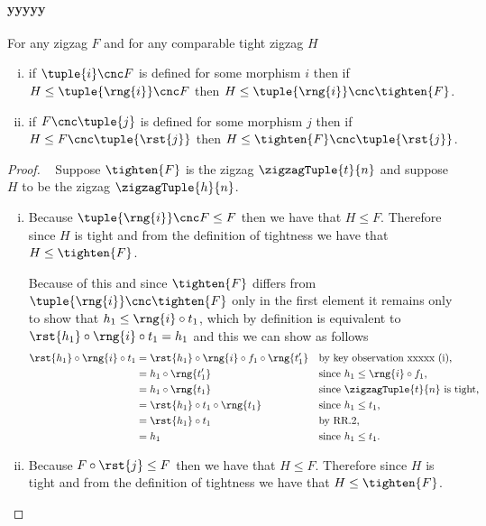 \paragraph*{yyyyy}
\begin{lemma}
For any zigzag $F$ and for any comparable tight zigzag $H$
\begin{enumerate}[(i)]
\item if $\tuple{i} \cnc F$ is defined for some morphism $i$ then
if  $H \leq \tuple{\rng{i}} \cnc F$
then $H \leq  \tuple{\rng{i}} \cnc \tighten{F}$.
\item if $F\cnc\tuple{j}$ is defined for some morphism $j$ then
if  $H \leq F \cnc \tuple{\rst{j}}$
then $H \leq  \tighten{F} \cnc \tuple{\rst{j}}$.
\end{enumerate}
\end{lemma}
\begin{proof}
~
Suppose $\tighten{F}$ is the zigzag $\zigzagTuple{t}{n}$
and suppose $H$ to be the zigzag $\zigzagTuple{h}{n}$.
\begin{enumerate}[(i)]
\item %
Because $\tuple{\rng{i}} \cnc F \leq F$ then we have that
$H \leq F$. Therefore since $H$ is tight and from the definition
of tightness we have that
$H \leq \tighten{F}$.

Because of this and since $\tighten{F}$ differs from
$\tuple{\rng{i}} \cnc \tighten{F}$ only in the first element
it remains only to show that
$h_1 \leq \rng{i} \circ t_1$, which by definition
is equivalent to $\rst{h_1} \circ \rng{i} \circ t_1 = h_1$
and this we  can show as follows
\begin{align*}
\rst{h_1} \circ \rng{i} \circ t_1
  &= \rst{h_1} \circ \rng{i} \circ f_1 \circ \rng{t'_1}
  && \mbox{by key observation xxxxx (i),}\\
  &= h_1 \circ \rng{t'_1} 
  && \mbox{since $h_1 \leq \rng{i} \circ f_1$,}\\
  &= h_1 \circ \rng{t_1}
  && \mbox{since $\zigzagTuple{t}{n}$ is tight, }\\
  &= \rst{h_1} \circ t_1 \circ \rng{t_1}
  && \mbox{since $h_1 \leq t_1$,}\\
  &= \rst{h_1} \circ t_1
  && \mbox{by RR.2,}\\
  &= h_1
  &&\mbox{since $h_1 \leq t_1$.}
\end{align*}

\item %
Because $F \circ \rst{j} \leq F$ then we have that $H \leq F$.
Therefore since $H$ is tight and from the definition
of tightness we have that $H \leq \tighten{F}$.


\end{enumerate}
\end{proof}

